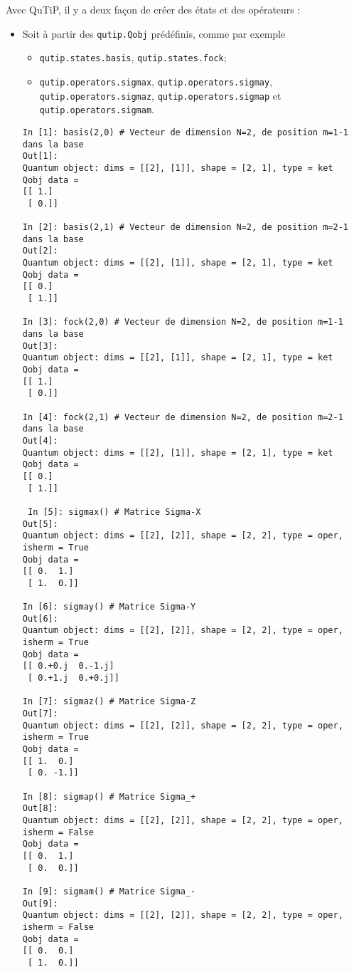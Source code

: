 Avec QuTiP, il y a deux façon de créer des états et des opérateurs :
\begin{itemize}
\item Soit à partir des \texttt{qutip.Qobj} prédéfinis, comme par exemple 
\begin{itemize}
\item \texttt{qutip.states.basis}, \texttt{qutip.states.fock};

\item \texttt{qutip.operators.sigmax}, \texttt{qutip.operators.sigmay}, 
\texttt{qutip.operators.sigmaz}, \texttt{qutip.operators.sigmap} et
\texttt{qutip.operators.sigmam}.
\end{itemize}


\begin{lstlisting}
In [1]: basis(2,0) # Vecteur de dimension N=2, de position m=1-1 dans la base
Out[1]: 
Quantum object: dims = [[2], [1]], shape = [2, 1], type = ket
Qobj data =
[[ 1.]
 [ 0.]]

In [2]: basis(2,1) # Vecteur de dimension N=2, de position m=2-1 dans la base
Out[2]: 
Quantum object: dims = [[2], [1]], shape = [2, 1], type = ket
Qobj data =
[[ 0.]
 [ 1.]]

In [3]: fock(2,0) # Vecteur de dimension N=2, de position m=1-1 dans la base
Out[3]: 
Quantum object: dims = [[2], [1]], shape = [2, 1], type = ket
Qobj data =
[[ 1.]
 [ 0.]]

In [4]: fock(2,1) # Vecteur de dimension N=2, de position m=2-1 dans la base
Out[4]: 
Quantum object: dims = [[2], [1]], shape = [2, 1], type = ket
Qobj data =
[[ 0.]
 [ 1.]]

 In [5]: sigmax() # Matrice Sigma-X
Out[5]: 
Quantum object: dims = [[2], [2]], shape = [2, 2], type = oper, isherm = True
Qobj data =
[[ 0.  1.]
 [ 1.  0.]]

In [6]: sigmay() # Matrice Sigma-Y
Out[6]: 
Quantum object: dims = [[2], [2]], shape = [2, 2], type = oper, isherm = True
Qobj data =
[[ 0.+0.j  0.-1.j]
 [ 0.+1.j  0.+0.j]]

In [7]: sigmaz() # Matrice Sigma-Z
Out[7]: 
Quantum object: dims = [[2], [2]], shape = [2, 2], type = oper, isherm = True
Qobj data =
[[ 1.  0.]
 [ 0. -1.]]

In [8]: sigmap() # Matrice Sigma_+
Out[8]: 
Quantum object: dims = [[2], [2]], shape = [2, 2], type = oper, isherm = False
Qobj data =
[[ 0.  1.]
 [ 0.  0.]]

In [9]: sigmam() # Matrice Sigma_-
Out[9]: 
Quantum object: dims = [[2], [2]], shape = [2, 2], type = oper, isherm = False
Qobj data =
[[ 0.  0.]
 [ 1.  0.]]


\end{lstlisting}
\end{itemize}
